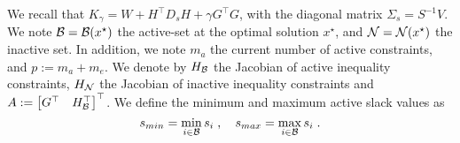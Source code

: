 We recall that $K_\gamma = W + H^\top D_s H + \gamma G^\top G$, with
the diagonal matrix $\Sigma_s = S^{-1} V$.
We note $\mathcal{B} = \mathcal{B}(x^\star)$ the active-set at the optimal solution $x^\star$,
and $\mathcal{N} = \mathcal{N}(x^\star)$ the inactive set.
In addition, we note $m_a$ the current number of
active constraints, and $p := m_a + m_e$. We denote by
$H_{\mathcal{B}}$ the Jacobian of active inequality constraints, $H_{\mathcal{N}}$ the
Jacobian of inactive inequality constraints and
$A := \begin{bmatrix} G^\top & H_{\mathcal{B}}^\top \end{bmatrix}^\top$.
We define the minimum and maximum active slack values as
\begin{equation}
  s_{min} = \min_{i \in \mathcal{B}} s_i \; , \quad
  s_{max} = \max_{i \in \mathcal{B}} s_i \; .
\end{equation}

